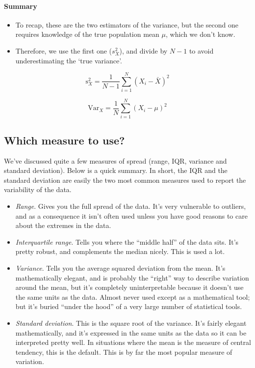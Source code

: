 \documentclass[
]{book}
\providecommand{\tightlist}{%
  \setlength{\itemsep}{0pt}\setlength{\parskip}{0pt}}
\begin{document}
\paragraph{Summary}\label{summary-1}

\begin{itemize}
\tightlist
\item
  To recap, these are the two estimators of the variance, but the second one requires knowledge of the true population mean \(\mu\), which we don't know.
\item
  Therefore, we use the first one (\(s_X^2\)), and divide by \(N-1\) to avoid underestimating the `true variance'.
\end{itemize}

\[
\mbox{s}_X^2 = \frac{1}{N-1} \sum_{i=1}^N \left( X_i - \bar{X} \right)^2
\]

\[
\mbox{Var}_X = \frac{1}{N} \sum_{i=1}^N \left( X_i - \mu \right)^2
\]

\subsection{Which measure to use?}\label{which-measure-to-use}

We've discussed quite a few measures of spread (range, IQR, variance and standard deviation). Below is a quick summary.
In short, the IQR and the standard deviation are easily the two most common measures used to report the variability of the data.

\begin{itemize}
\tightlist
\item
  \emph{Range}. Gives you the full spread of the data. It's very vulnerable to outliers, and as a consequence it isn't often used unless you have good reasons to care about the extremes in the data.
\item
  \emph{Interquartile range}. Tells you where the ``middle half'' of the data sits. It's pretty robust, and complements the median nicely. This is used a lot.
\item
  \emph{Variance}. Tells you the average squared deviation from the mean. It's mathematically elegant, and is probably the ``right'' way to describe variation around the mean, but it's completely uninterpretable because it doesn't use the same units as the data. Almost never used except as a mathematical tool; but it's buried ``under the hood'' of a very large number of statistical tools.
\item
  \emph{Standard deviation}. This is the square root of the variance. It's fairly elegant mathematically, and it's expressed in the same units as the data so it can be interpreted pretty well. In situations where the mean is the measure of central tendency, this is the default. This is by far the most popular measure of variation.
\end{itemize}
\end{document}
